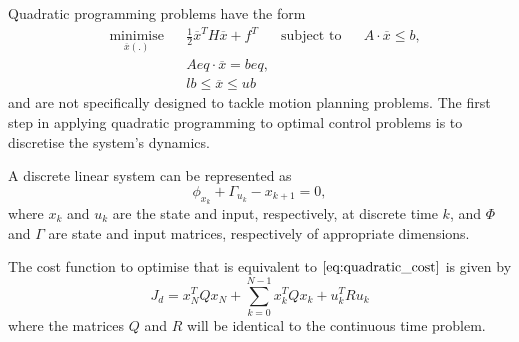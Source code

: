 \par Quadratic programming problems have the form
\begin{equation}
    \label{eq:gen_quad_prog}
    \begin{aligned}
    & \underset{\overline{x}(.)}{\text{minimise}} && \frac{1}{2} \overline{x}^T H \overline{x} + f^T  
    & \text{subject to} && A \cdot \overline{x} \leq b, \\
    & && Aeq \cdot \overline{x} = beq, \\
    & && lb \leq \overline{x} \leq ub
    \end{aligned}
\end{equation} 
and are not specifically designed to tackle motion planning problems. The first step in applying quadratic programming to optimal control problems is to discretise the system's dynamics. 
\par A discrete linear system can be represented as
\begin{equation}
    \label{eq:discrete_state_space} 
    \phi_{x_k} + \Gamma_{u_k} - x_{k+1} = 0,
\end{equation}
where $x_k$ and $u_k$ are the state and input, respectively, at discrete time $k$, and $\Phi$ and $\Gamma$ are state and input matrices, respectively of appropriate dimensions.
\par The cost function to optimise that is equivalent to $\ref{eq:quadratic_cost}$ is given by
\begin{equation}
    J_d = x_N^T Q x_N + \sum_{k=0}^{N-1} x_k^T Q x_k + u_k^T R u_k
    \label{eq:discrete_quad_cost}
\end{equation}
where the matrices $Q$ and $R$ will be identical to the continuous time problem.

